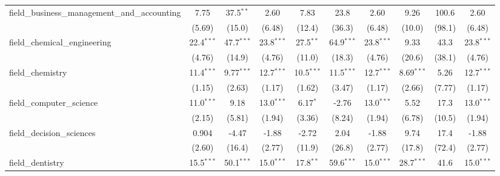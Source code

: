 \begin{tabular}{lccccccccc}
   field\_business\_management\_and\_accounting                & 7.75          & 37.5$^{**}$    & 2.60          & 7.83          & 23.8          & 2.60          & 9.26          & 100.6          & 2.60\\   
                                                               & (5.69)        & (15.0)         & (6.48)        & (12.4)        & (36.3)        & (6.48)        & (10.0)        & (98.1)         & (6.48)\\   
   field\_chemical\_engineering                                & 22.4$^{***}$  & 47.7$^{***}$   & 23.8$^{***}$  & 27.5$^{**}$   & 64.9$^{***}$  & 23.8$^{***}$  & 9.33          & 43.3           & 23.8$^{***}$\\   
                                                               & (4.76)        & (14.9)         & (4.76)        & (11.0)        & (18.3)        & (4.76)        & (20.6)        & (38.1)         & (4.76)\\   
   field\_chemistry                                            & 11.4$^{***}$  & 9.77$^{***}$   & 12.7$^{***}$  & 10.5$^{***}$  & 11.5$^{***}$  & 12.7$^{***}$  & 8.69$^{***}$  & 5.26           & 12.7$^{***}$\\   
                                                               & (1.15)        & (2.63)         & (1.17)        & (1.62)        & (3.47)        & (1.17)        & (2.66)        & (7.77)         & (1.17)\\   
   field\_computer\_science                                    & 11.0$^{***}$  & 9.18           & 13.0$^{***}$  & 6.17$^{*}$    & -2.76         & 13.0$^{***}$  & 5.52          & 17.3           & 13.0$^{***}$\\   
                                                               & (2.15)        & (5.81)         & (1.94)        & (3.36)        & (8.24)        & (1.94)        & (6.78)        & (10.5)         & (1.94)\\   
   field\_decision\_sciences                                   & 0.904         & -4.47          & -1.88         & -2.72         & 2.04          & -1.88         & 9.74          & 17.4           & -1.88\\   
                                                               & (2.60)        & (16.4)         & (2.77)        & (11.9)        & (26.8)        & (2.77)        & (17.8)        & (72.4)         & (2.77)\\   
   field\_dentistry                                            & 15.5$^{***}$  & 50.1$^{***}$   & 15.0$^{***}$  & 17.8$^{**}$   & 59.6$^{***}$  & 15.0$^{***}$  & 28.7$^{***}$  & 41.6           & 15.0$^{***}$\\   

\end{tabular}
